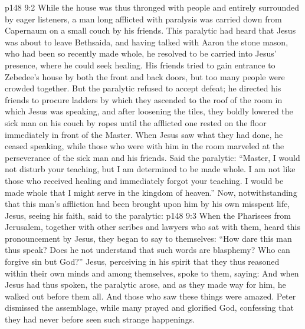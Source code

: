 \vs p148 9:2 While the house was thus thronged with people and entirely surrounded by eager listeners, a man long afflicted with paralysis was carried down from Capernaum on a small couch by his friends. This paralytic had heard that Jesus was about to leave Bethsaida, and having talked with Aaron the stone mason, who had been so recently made whole, he resolved to be carried into Jesus’ presence, where he could seek healing. His friends tried to gain entrance to Zebedee’s house by both the front and back doors, but too many people were crowded together. But the paralytic refused to accept defeat; he directed his friends to procure ladders by which they ascended to the roof of the room in which Jesus was speaking, and after loosening the tiles, they boldly lowered the sick man on his couch by ropes until the afflicted one rested on the floor immediately in front of the Master. When Jesus saw what they had done, he ceased speaking, while those who were with him in the room marveled at the perseverance of the sick man and his friends. Said the paralytic: “Master, I would not disturb your teaching, but I am determined to be made whole. I am not like those who received healing and immediately forgot your teaching. I would be made whole that I might serve in the kingdom of heaven.” Now, notwithstanding that this man’s affliction had been brought upon him by his own misspent life, Jesus, seeing his faith, said to the paralytic: 
\vs p148 9:3 When the Pharisees from Jerusalem, together with other scribes and lawyers who sat with them, heard this pronouncement by Jesus, they began to say to themselves: “How dare this man thus speak? Does he not understand that such words are blasphemy? Who can forgive sin but God?” Jesus, perceiving in his spirit that they thus reasoned within their own minds and among themselves, spoke to them, saying:  And when Jesus had thus spoken, the paralytic arose, and as they made way for him, he walked out before them all. And those who saw these things were amazed. Peter dismissed the assemblage, while many prayed and glorified God, confessing that they had never before seen such strange happenings.
